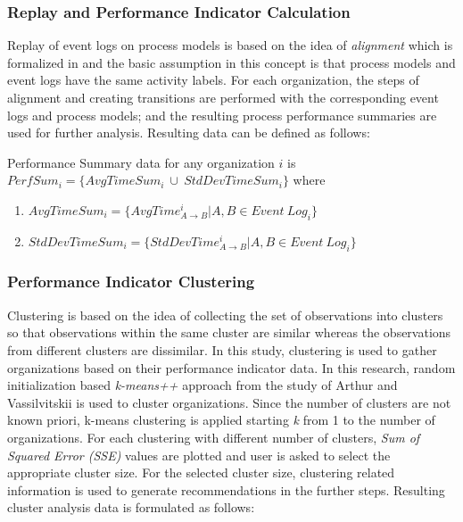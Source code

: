 \subsubsection{Replay and Performance Indicator Calculation}
\label{subsubsec:replay-and-performance-summary}
Replay of event logs on process models is based on the idea of \textit{alignment} which is formalized in \cite{van2012replaying} and the basic assumption in this concept is that process models and event logs have the same activity labels. For each organization, the steps of alignment and creating transitions are performed with the corresponding event logs and process models; and the resulting process performance summaries are used for further analysis. Resulting data can be defined as follows:
  \theoremstyle{definition}
  \begin{definition}{} Performance Summary data for any organization $i$ is $PerfSum_{i}= \{AvgTimeSum_{i}\ \cup\ StdDevTimeSum_{i}\}$ where
    \begin{enumerate}
      \item $AvgTimeSum_{i} = \{ AvgTime_{A \rightarrow B}^{i} | A , B  \in Event\ Log_{i}\}$
      \item $StdDevTimeSum_{i} = \{ StdDevTime_{ A\rightarrow B}^{i} | A, B  \in Event\ Log_{i}\}$
    \end{enumerate}
  \end{definition}

\subsubsection{Performance Indicator Clustering}
\label{subsubsec:performance-indicator-clustering}
Clustering is based on the idea of collecting the set of observations into clusters so that observations within the same cluster are similar whereas the observations from different clusters are dissimilar. In this study, clustering is used to gather organizations based on their performance indicator data. In this research, random initialization based \textit{k-means++} approach from the study of Arthur and Vassilvitskii \cite{arthur2007} is used to cluster organizations. Since the number of clusters are not known priori, k-means clustering is applied starting \textit{k} from 1 to the number of organizations. For each clustering with different number of clusters, \textit{Sum of Squared Error (SSE)} values are plotted and user is asked to select the appropriate cluster size. For the selected cluster size, clustering related information is used to generate recommendations in the further steps. Resulting cluster analysis data is formulated as follows:

